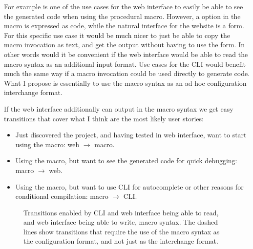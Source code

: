 For example is one of the use cases for the web interface to easily be able to see the generated code when using the procedural macro. However, a option in the macro is expressed as code, while the natural interface for the website is a form. For this specific use case it would be much nicer to just be able to copy the macro invocation as text, and get the output without having to use the form. In other words would it be convenient if the web interface would be able to read the macro syntax as an additional input format. Use cases for the CLI would benefit much the same way if a macro invocation could be used directly to generate code. What I propose is essentially to use the macro syntax as an ad hoc configuration interchange format.

If the web interface additionally can output in the macro syntax we get easy transitions that cover what I think are the most likely user stories:

\begin{itemize}
  \item Just discovered the project, and having tested in web interface, want to start using the macro: web $\rightarrow$ macro.
  \item Using the macro, but want to see the generated code for quick debugging: macro $\rightarrow$ web.
  \item Using the macro, but want to use CLI for autocomplete or other reasons for conditional compilation: macro $\rightarrow$ CLI.
\end{itemize}

\begin{figure}[ht!]
\vspace{2mm}
\centering
{}
\vspace{2mm}
\caption{Transitions enabled by CLI and web interface being able to read, and web interface being able to write, macro syntax. The dashed lines show transitions that require the use of the macro syntax as the configuration format, and not just as the interchange format.}
\label{fig:transitions}
\end{figure}

